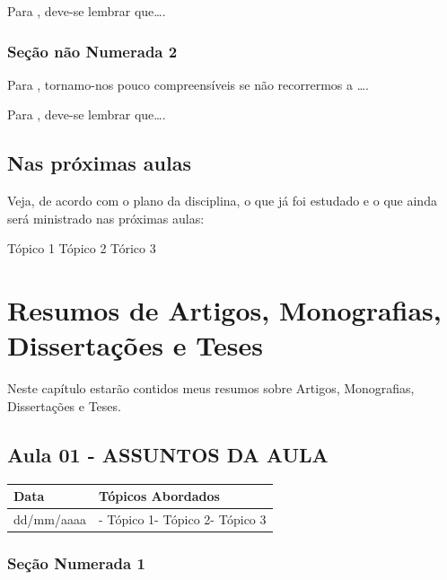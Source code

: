 \documentclass[
]{book}
\begin{document}
Para \citet{DAVIDOFF2001}, deve-se lembrar que\ldots.

\hypertarget{seuxe7uxe3o-nuxe3o-numerada-2-17}{%
\subsection*{Seção não Numerada 2}\label{seuxe7uxe3o-nuxe3o-numerada-2-17}}

Para \citet{BOCK2001}, tornamo-nos pouco compreensíveis se não recorrermos a \ldots.

Para \citet{DAVIDOFF2001}, deve-se lembrar que\ldots.

\hypertarget{nas-pruxf3ximas-aulas-2}{%
\section{Nas próximas aulas}\label{nas-pruxf3ximas-aulas-2}}

Veja, de acordo com o plano da disciplina, o que já foi estudado e o que ainda será ministrado nas próximas aulas:

Tópico 1
Tópico 2
Tórico 3

\hypertarget{resumos-de-artigos-monografias-dissertauxe7uxf5es-e-teses}{%
\chapter{Resumos de Artigos, Monografias, Dissertações e Teses}\label{resumos-de-artigos-monografias-dissertauxe7uxf5es-e-teses}}

Neste capítulo estarão contidos meus resumos sobre Artigos, Monografias, Dissertações e Teses.

\hypertarget{aula-01---assuntos-da-aula-1}{%
\section{Aula 01 - ASSUNTOS DA AULA}\label{aula-01---assuntos-da-aula-1}}

\begin{longtable}[]{@{}ll@{}}
\toprule()
Data & Tópicos Abordados \\
\midrule()
\endhead
dd/mm/aaaa & - Tópico 1- Tópico 2- Tópico 3 \\
\bottomrule()
\end{longtable}

\hypertarget{seuxe7uxe3o-numerada-1-6}{%
\subsection{Seção Numerada 1}\label{seuxe7uxe3o-numerada-1-6}}
\end{document}
